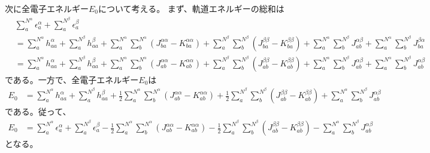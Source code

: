 次に全電子エネルギー$E_0$について考える。
まず、軌道エネルギーの総和は
\begin{align}
&
	\sum_a^{N^\alpha}
		\epsilon^\alpha_a
	+
	\sum_a^{N^\beta}
		\epsilon^\beta_a \\
%
%
&=
	\sum_a^{N^\alpha}
		h^\alpha_{aa}
	+
	\sum_a^{N^\beta}
		h^\beta_{aa}
	+
	\sum_a^{N^\alpha}
	\sum_b^{N^\alpha}\left(
		J^{\alpha\alpha}_{ba}
		-
		K^{\alpha\alpha}_{ba}
	\right)
	+
	\sum_a^{N^\beta}
	\sum_b^{N^\beta}\left(
		J^{\beta\beta}_{ba}
		-
		K^{\beta\beta}_{ba}
	\right)
	+
	\sum_a^{N^\alpha}
	\sum_b^{N^\beta}
		J^{\alpha\beta}_{ab}
	+
	\sum_a^{N^\alpha}
	\sum_b^{N^\beta}
		J^{\beta\alpha}_{ba} \\
%
%
&=
	\sum_a^{N^\alpha}
		h^\alpha_{aa}
	+
	\sum_a^{N^\beta}
		h^\beta_{aa}
	+
	\sum_a^{N^\alpha}
	\sum_b^{N^\alpha}\left(
		J^{\alpha\alpha}_{ab}
		-
		K^{\alpha\alpha}_{ab}
	\right)
	+
	\sum_a^{N^\beta}
	\sum_b^{N^\beta}\left(
		J^{\beta\beta}_{ab}
		-
		K^{\beta\beta}_{ab}
	\right)
	+
	\sum_a^{N^\alpha}
	\sum_b^{N^\beta}
		J^{\alpha\beta}_{ab}
	+
	\sum_a^{N^\alpha}
	\sum_b^{N^\beta}
		J^{\alpha\beta}_{ab}
\end{align}
である。一方で、全電子エネルギー$E_0$は
\begin{align}
	E_0
&=
	\sum_a^{N^\alpha}
		h^\alpha_{aa}
	+
	\sum_a^{N^\beta}
		h^\beta_{aa}
	+
	\frac{1}{2}
	\sum_a^{N^\alpha}
	\sum_b^{N^\alpha}\left(
		J^{\alpha\alpha}_{ab}
		-
		K^{\alpha\alpha}_{ab}
	\right)
	+
	\frac{1}{2}
	\sum_a^{N^\beta}
	\sum_b^{N^\beta}\left(
		J^{\beta\beta}_{ab}
		-
		K^{\beta\beta}_{ab}
	\right)
	+
	\sum_a^{N^\alpha}
	\sum_b^{N^\beta}
		J^{\alpha\beta}_{ab}
\end{align}
である。従って、
\begin{align}
	E_0
&=
	\sum_a^{N^\alpha}
		\epsilon^\alpha_a
	+
	\sum_a^{N^\beta}
		\epsilon^\beta_a
	-
	\frac{1}{2}
	\sum_a^{N^\alpha}
	\sum_b^{N^\alpha}\left(
		J^{\alpha\alpha}_{ab}
		-
		K^{\alpha\alpha}_{ab}
	\right)
	-
	\frac{1}{2}
	\sum_a^{N^\beta}
	\sum_b^{N^\beta}\left(
		J^{\beta\beta}_{ab}
		-
		K^{\beta\beta}_{ab}
	\right)
	-
	\sum_a^{N^\alpha}
	\sum_b^{N^\beta}
		J^{\alpha\beta}_{ab}
\end{align}
となる。

